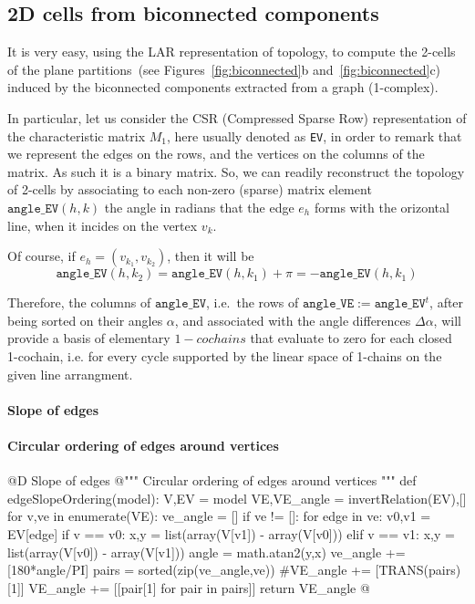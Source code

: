\documentclass[11pt,oneside]{article}    %
\begin{document}
\subsection{2D cells from biconnected components}

It is very easy,  using the LAR representation of topology, to compute the 2-cells of the plane partitions~(see Figures~\ref{fig:biconnected}b and~\ref{fig:biconnected}c) induced by the biconnected components extracted from a graph (1-complex).

In particular, let us consider the CSR (Compressed Sparse Row) representation of the characteristic matrix $M_1$, here usually denoted as \texttt{EV}, in order to remark that we represent the edges on the rows, and the vertices on the columns of the matrix. As such it is a binary matrix. So, we can readily reconstruct the topology of 2-cells by associating to each non-zero (sparse) matrix element $\texttt{angle\_EV}(h,k)$ the angle in radians that the edge $e_h$ forms with the orizontal line, when it incides on the vertex $v_k$. 

Of course, if $e_h = (v_{k_1},v_{k_2})$, then it will be 
\[
\texttt{angle\_EV}(h,k_2) = \texttt{angle\_EV}(h,k_1)+\pi = -\texttt{angle\_EV}(h,k_1)
\]

Therefore, the columns of $\texttt{angle\_EV}$, i.e.~the rows of $\texttt{angle\_VE} := \texttt{angle\_EV}^t$,
after being sorted on their angles $\alpha$, and associated with the angle differences $\Delta\alpha$, will provide a basis of elementary $1-cochains$ that evaluate to zero for each closed 1-cochain, i.e. for every cycle supported by the linear space of 1-chains on the given line arrangment.


\paragraph{Slope of edges}

\paragraph{Circular ordering of edges around vertices}
@D Slope of edges
@{""" Circular ordering of edges around vertices """
def edgeSlopeOrdering(model):
    V,EV = model
    VE,VE_angle = invertRelation(EV),[]
    for v,ve in enumerate(VE):
        ve_angle = []
        if ve != []:
            for edge in ve:
                v0,v1 = EV[edge]
                if v == v0:     x,y = list(array(V[v1]) - array(V[v0]))
                elif v == v1:    x,y = list(array(V[v0]) - array(V[v1]))
                angle = math.atan2(y,x)
                ve_angle += [180*angle/PI]
        pairs = sorted(zip(ve_angle,ve))
        #VE_angle += [TRANS(pairs)[1]]
        VE_angle += [[pair[1] for pair in pairs]]
    return VE_angle
@}
\end{document}
